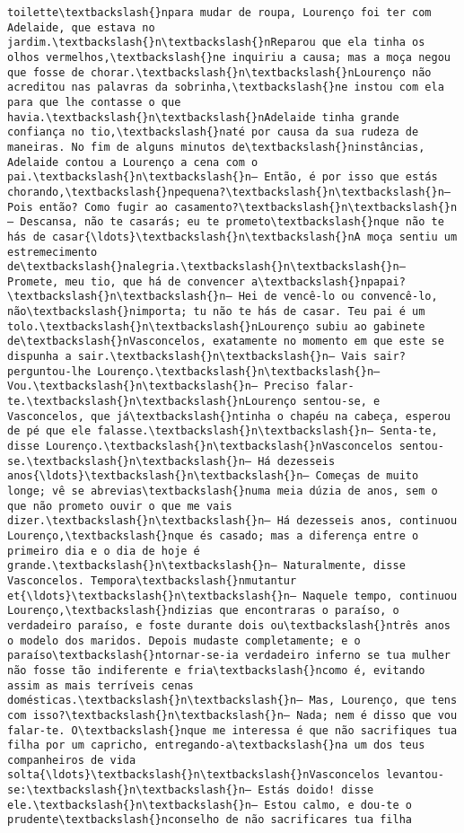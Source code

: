 \documentclass[11pt]{article}
\begin{document}
\begin{Verbatim}[commandchars=\\\{\}]
toilette\textbackslash{}npara mudar de roupa, Lourenço foi ter com Adelaide, que estava no jardim.\textbackslash{}n\textbackslash{}nReparou que ela tinha os olhos vermelhos,\textbackslash{}ne inquiriu a causa; mas a moça negou que fosse de chorar.\textbackslash{}n\textbackslash{}nLourenço não acreditou nas palavras da sobrinha,\textbackslash{}ne instou com ela para que lhe contasse o que havia.\textbackslash{}n\textbackslash{}nAdelaide tinha grande confiança no tio,\textbackslash{}naté por causa da sua rudeza de maneiras. No fim de alguns minutos de\textbackslash{}ninstâncias, Adelaide contou a Lourenço a cena com o pai.\textbackslash{}n\textbackslash{}n— Então, é por isso que estás chorando,\textbackslash{}npequena?\textbackslash{}n\textbackslash{}n— Pois então? Como fugir ao casamento?\textbackslash{}n\textbackslash{}n— Descansa, não te casarás; eu te prometo\textbackslash{}nque não te hás de casar{\ldots}\textbackslash{}n\textbackslash{}nA moça sentiu um estremecimento de\textbackslash{}nalegria.\textbackslash{}n\textbackslash{}n— Promete, meu tio, que há de convencer a\textbackslash{}npapai?\textbackslash{}n\textbackslash{}n— Hei de vencê-lo ou convencê-lo, não\textbackslash{}nimporta; tu não te hás de casar. Teu pai é um tolo.\textbackslash{}n\textbackslash{}nLourenço subiu ao gabinete de\textbackslash{}nVasconcelos, exatamente no momento em que este se dispunha a sair.\textbackslash{}n\textbackslash{}n— Vais sair? perguntou-lhe Lourenço.\textbackslash{}n\textbackslash{}n— Vou.\textbackslash{}n\textbackslash{}n— Preciso falar-te.\textbackslash{}n\textbackslash{}nLourenço sentou-se, e Vasconcelos, que já\textbackslash{}ntinha o chapéu na cabeça, esperou de pé que ele falasse.\textbackslash{}n\textbackslash{}n— Senta-te, disse Lourenço.\textbackslash{}n\textbackslash{}nVasconcelos sentou-se.\textbackslash{}n\textbackslash{}n— Há dezesseis anos{\ldots}\textbackslash{}n\textbackslash{}n— Começas de muito longe; vê se abrevias\textbackslash{}numa meia dúzia de anos, sem o que não prometo ouvir o que me vais dizer.\textbackslash{}n\textbackslash{}n— Há dezesseis anos, continuou Lourenço,\textbackslash{}nque és casado; mas a diferença entre o primeiro dia e o dia de hoje é grande.\textbackslash{}n\textbackslash{}n— Naturalmente, disse Vasconcelos. Tempora\textbackslash{}nmutantur et{\ldots}\textbackslash{}n\textbackslash{}n— Naquele tempo, continuou Lourenço,\textbackslash{}ndizias que encontraras o paraíso, o verdadeiro paraíso, e foste durante dois ou\textbackslash{}ntrês anos o modelo dos maridos. Depois mudaste completamente; e o paraíso\textbackslash{}ntornar-se-ia verdadeiro inferno se tua mulher não fosse tão indiferente e fria\textbackslash{}ncomo é, evitando assim as mais terríveis cenas domésticas.\textbackslash{}n\textbackslash{}n— Mas, Lourenço, que tens com isso?\textbackslash{}n\textbackslash{}n— Nada; nem é disso que vou falar-te. O\textbackslash{}nque me interessa é que não sacrifiques tua filha por um capricho, entregando-a\textbackslash{}na um dos teus companheiros de vida solta{\ldots}\textbackslash{}n\textbackslash{}nVasconcelos levantou-se:\textbackslash{}n\textbackslash{}n— Estás doido! disse ele.\textbackslash{}n\textbackslash{}n— Estou calmo, e dou-te o prudente\textbackslash{}nconselho de não sacrificares tua filha 
\end{Verbatim}
\end{document}
